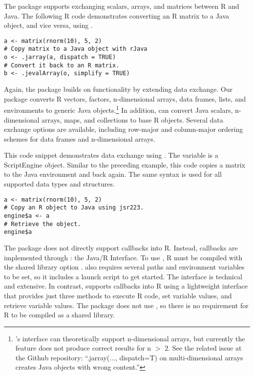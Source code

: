 The  package supports exchanging scalars, arrays, and matrices between R and Java. The following R code demonstrates converting an R matrix to a Java object, and vice versa, using .

\begin{verbatim}
a <- matrix(rnorm(10), 5, 2)
# Copy matrix to a Java object with rJava
o <- .jarray(a, dispatch = TRUE)
# Convert it back to an R matrix.
b <- .jevalArray(o, simplify = TRUE)
\end{verbatim}

Again, the  package builds on  functionality by extending data exchange. Our package converts R vectors, factors, n-dimensional arrays, data frames, lists, and environments to generic Java objects.\footnote{'s interface can theoretically support n-dimensional arrays, but currently the feature does not produce correct results for n $>$ 2. See the related issue at the  Github repository: ``.jarray(..., dispatch=T) on multi-dimensional arrays creates Java objects with wrong content.''} In addition,  can convert Java scalars, n-dimensional arrays, maps, and collections to base R objects. Several data exchange options are available, including row-major and column-major ordering schemes for data frames and n-dimensional arrays. %

This code snippet demonstrates data exchange using . The variable  is a  ScriptEngine object. Similar to the preceding  example, this code copies a matrix to the Java environment and back again. The same syntax is used for all supported data types and structures.

\begin{verbatim}
a <- matrix(rnorm(10), 5, 2)
# Copy an R object to Java using jsr223.
engine$a <- a
# Retrieve the object.
engine$a
\end{verbatim}

The  package does not directly support callbacks into R. Instead, callbacks are implemented through : the Java/R Interface. To use , R must be compiled with the shared library option .  also requires several paths and environment variables to be set, so it includes a launch script to get started. The  interface is technical and extensive. In contrast,  supports callbacks into R using a lightweight interface that provides just three methods to execute R code, set variable values, and retrieve variable values. The  package does not use , so there is no requirement for R to be compiled as a shared library.


